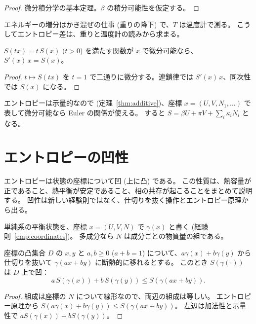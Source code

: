 \begin{proof}
  \leanok
  微分積分学の基本定理。$\beta$ の積分可能性を仮定する。
\end{proof}

エネルギーの増分はかき混ぜの仕事 (重りの降下) で、$T$ は温度計で測る。
こうしてエントロピー差は、重りと温度計の読みから求まる。

\begin{theorem}
  \label{thm:euler}
  \leanok
  $S(tx) = t\, S(x)$ ($t > 0$) を満たす関数が $x$ で微分可能なら、$S'(x)\, x = S(x)$。
\end{theorem}

\begin{proof}
  \leanok
  $t \mapsto S(tx)$ を $t = 1$ で二通りに微分する。連鎖律では $S'(x)\, x$、同次性では $S(x)$ になる。
\end{proof}

エントロピーは示量的なので (定理~\ref{thm:additive})、座標 $x = (U, V, N_1, \dots)$ で表して微分可能なら Euler の関係が使える。
すると $S = \beta U + \pi V + \sum_i \kappa_i N_i$ となる。

\section{エントロピーの凹性}
\label{sec:concavity}

エントロピーは状態の座標について凹 (上に凸) である。
この性質は、熱容量が正であること、熱平衡が安定であること、相の共存が起こることをまとめて説明する。
凹性は新しい経験則ではなく、仕切りを抜く操作とエントロピー原理から出る。

単純系の平衡状態を、座標 $x = (U, V, N)$ で $\gamma(x)$ と書く (経験則~\ref{emp:coordinates})。
多成分なら $N$ は成分ごとの物質量の組である。

\begin{theorem}[エントロピーは凹]
  \label{thm:entropy-concave}
  \leanok
  座標の凸集合 $D$ の $x, y$ と $a, b \ge 0$ ($a + b = 1$) について、$a\gamma(x) + b\gamma(y)$ から仕切りを抜いて $\gamma(ax + by)$ に断熱的に移れるとする。
  このとき $S(\gamma(\cdot))$ は $D$ 上で凹：
  \[ a\, S(\gamma(x)) + b\, S(\gamma(y)) \le S(\gamma(ax + by)). \]
\end{theorem}

\begin{proof}
  \leanok
  組成は座標の $N$ について線形なので、両辺の組成は等しい。
  エントロピー原理から $S(a\gamma(x) + b\gamma(y)) \le S(\gamma(ax + by))$。
  左辺は加法性と示量性で $a S(\gamma(x)) + b S(\gamma(y))$。
\end{proof}

